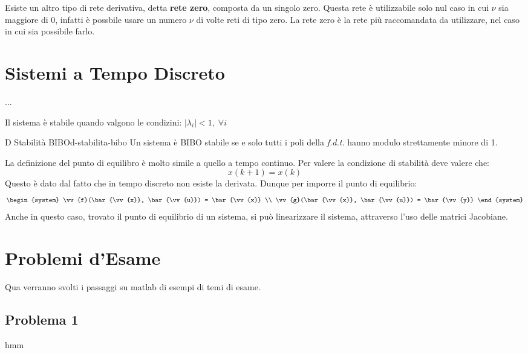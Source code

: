 \documentclass[12pt]{article}
\begin{document}
Esiste un altro tipo di rete derivativa, detta \textbf{rete zero}, composta da un singolo zero. Questa rete \`e utilizzabile solo nul caso in cui $\nu$ sia maggiore di 0, infatti \`e possbile usare un numero $\nu$ di volte reti di tipo zero. La rete zero \`e la rete pi\`u raccomandata da utilizzare, nel caso in cui sia possibile farlo.



\newpage
\section{Sistemi a Tempo Discreto}

...

Il sistema \`e stabile quando valgono le condizini: $|\lambda_i| < 1,\; \forall i$

\begin{definition}{D Stabilit\`a BIBO}{d-stabilita-bibo}
    Un sistema \`e BIBO stabile se e solo tutti i poli della \emph{f.d.t.} hanno modulo strettamente minore di 1.
\end{definition}

La definizione del punto di equilibro \`e molto simile a quello a tempo continuo. Per valere la condizione di stabilit\`a deve valere che:
\[ \boxed{x(k+1) = x(k)} \]
Questo \`e dato dal fatto che in tempo discreto non esiste la derivata.
Dunque per imporre il punto di equilibrio:
\[ \begin{system} 
\vv{f}(\bar{\vv{x}}, \bar{\vv{u}}) = \bar{\vv{x}} \\
\vv{g}(\bar{\vv{x}}, \bar{\vv{u}}) = \bar{\vv{y}}
\end{system}  \]
Anche in questo caso, trovato il punto di equilibrio di un sistema, si pu\`o linearizzare il sistema, attraverso l'uso delle matrici Jacobiane.









\newpage
\section{Problemi d'Esame}
Qua verranno svolti i passaggi su matlab di esempi di temi di esame.

\subsection{Problema 1}
hmm
\end{document}
